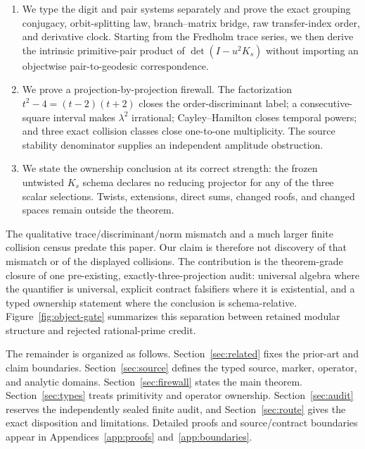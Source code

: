 \begin{enumerate}
  \item We type the digit and pair systems separately and prove the exact
  grouping conjugacy, orbit-splitting law, branch--matrix bridge, raw
  transfer-index order, and derivative clock.  Starting from the Fredholm
  trace series, we then derive the intrinsic primitive-pair product of
  $\det(I-u^2K_s)$ without importing an objectwise pair-to-geodesic
  correspondence.
  \item We prove a projection-by-projection firewall.  The factorization
  $t^2-4=(t-2)(t+2)$ closes the order-discriminant label; a consecutive-square
  interval makes $\lambda^2$ irrational; Cayley--Hamilton closes temporal
  powers; and three exact collision classes close one-to-one multiplicity.
  The source stability denominator supplies an independent amplitude
  obstruction.
  \item We state the ownership conclusion at its correct strength: the
  frozen untwisted $K_s$ schema declares no reducing projector for any of the
  three scalar selections.  Twists, extensions, direct sums, changed roofs,
  and changed spaces remain outside the theorem.
\end{enumerate}

The qualitative trace/discriminant/norm mismatch and a much larger finite
collision census predate this paper.  Our claim is therefore not discovery of
that mismatch or of the displayed collisions.  The contribution is the
theorem-grade closure of one pre-existing, exactly-three-projection audit:
universal algebra where the quantifier is universal, explicit contract
falsifiers where it is existential, and a typed ownership statement where
the conclusion is schema-relative.  Figure~\ref{fig:object-gate} summarizes
this separation between retained modular structure and rejected
rational-prime credit.

The remainder is organized as follows.  Section~\ref{sec:related} fixes the
prior-art and claim boundaries.  Section~\ref{sec:source} defines the typed
source, marker, operator, and analytic domains.  Section~\ref{sec:firewall}
states the main theorem.  Section~\ref{sec:types} treats primitivity and
operator ownership.  Section~\ref{sec:audit} reserves the independently
sealed finite audit, and Section~\ref{sec:route} gives the exact disposition
and limitations.  Detailed proofs and source/contract boundaries appear in
Appendices~\ref{app:proofs} and~\ref{app:boundaries}.
